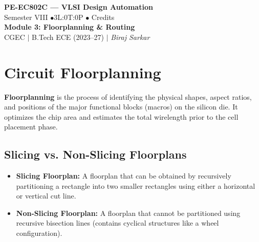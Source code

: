 \documentclass[12pt,a4paper]{article}
\begin{document}

\begin{center}
  {\LARGE\bfseries\color{myred} PE-EC802C --- VLSI Design Automation}\\[5pt]
  {\normalsize\color{mydark} Semester VIII \quad$\bullet$\quad 3L:0T:0P \quad$\bullet$ Credits}\\[3pt]
  {\normalsize\color{myteal}\textbf{Module 3: Floorplanning \& Routing}}\\[3pt]
  {\small\color{mydark} CGEC \;$|$\; B.Tech ECE (2023--27) \;$|$\; \textit{Biraj Sarkar}}
\end{center}
\vspace{2pt}
\noindent{\color{myred}\rule{\linewidth}{1.5pt}}
\vspace{2pt}

\hypersetup{linkcolor=mydark}
\tableofcontents
\hypersetup{linkcolor=myteal}
\newpage

\section{Circuit Floorplanning}

\begin{tcolorbox}[defbox, title={Circuit Floorplanning}]
  \textbf{Floorplanning} is the process of identifying the physical shapes, aspect ratios, and positions of the major functional blocks (macros) on the silicon die. It optimizes the chip area and estimates the total wirelength prior to the cell placement phase.
\end{tcolorbox}

\subsection{Slicing vs. Non-Slicing Floorplans}
\begin{itemize}[leftmargin=*, itemsep=2pt]
  \item \textbf{Slicing Floorplan:} A floorplan that can be obtained by recursively partitioning a rectangle into two smaller rectangles using either a horizontal or vertical cut line.
  \item \textbf{Non-Slicing Floorplan:} A floorplan that cannot be partitioned using recursive bisection lines (contains cyclical structures like a wheel configuration).
\end{itemize}
\end{document}
